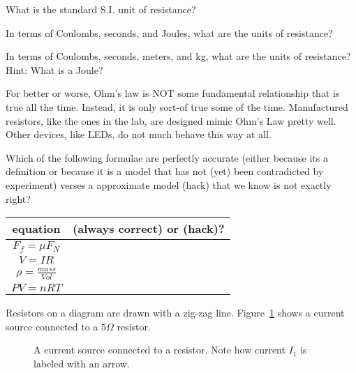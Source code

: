 \begin{alevel}
What is the standard S.I. unit of resistance?
\end{alevel}

\begin{clevel}
In terms of Coulombs, seconds, and Joules, what are the units of resistance?
\end{clevel}

\begin{clevel}
In terms of Coulombs, seconds, meters, and kg, what are the units of resistance? Hint: What is a Joule?
\end{clevel}

For better or worse, Ohm's law is NOT some fundamental relationship that is true all the time. Instead, it is only sort-of true some of the time. Manufactured resistors, like the ones in the lab, are designed mimic Ohm's Law pretty well. Other devices, like LEDs, do not much behave this way at all.\par

\begin{blevel}
Which of the following formulae are perfectly accurate (either because its a definition or because it is a model that has not (yet) been contradicted by experiment) verses a approximate model (hack) that we know is not exactly right?\\
\begin{center}
\begin{tabular}{|c|c|}\hline
equation & (always correct) or (hack)? \\ \hline
$F_f=\mu F_N$ & \\ \hline
$V=IR$ & \\ \hline
$\rho=\frac{mass}{Vol}$ & \\ \hline
$PV=nRT$ & \\ \hline
\end{tabular}
\end{center}
\end{blevel}

Resistors on a diagram are drawn with a zig-zag line. Figure~\ref{F:21} shows a current source connected to a $5 \Omega$ resistor.

\begin{figure}[H]
\begin{center}
\caption{A current source connected to a resistor. Note how current $I_1$ is labeled with an arrow.}
\label{F:21}
\end{center}
\end{figure}

